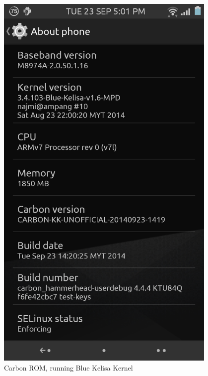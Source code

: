 \documentclass{beamer}
\begin{document}
{\begin{frame}
\begin{columns}[t]
\begin{column}{5cm}
 
\end{column}

 \begin{column}{5cm}
 \begin{figure}
 \includegraphics[scale=0.1]{carbon}
   \caption{\tiny{Carbon ROM, running Blue Kelisa Kernel}}
 \end{figure}
 \end{column}

\end{columns}
 \end{frame}
}
\end{document}
